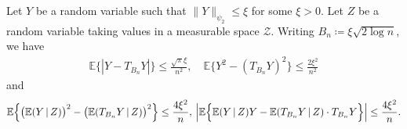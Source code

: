 \documentclass[10pt,a4paper]{amsart}
\begin{document}
\begin{lemma} \label{lemma:truncation-bias}
    Let $Y$ be a random variable such that $\|Y\|_{\psi_2} \leq \xi$ for some $\xi > 0$.  Let $Z$ be a random variable taking values in a measurable space $\mathcal{Z}$.  Writing $B_n\coloneqq \xi\sqrt{2\log n}$, we have
    \begin{align*}
        \mathbb{E}\{|Y - T_{B_n}Y|\} \leq \frac{\sqrt{\pi}\xi}{n^2}, \quad \mathbb{E}\bigl\{Y^2 - (T_{B_n}Y)^2\bigr\} \leq \frac{2\xi^2}{n^2}
    \end{align*}
    and
    \begin{align*}
        \mathbb{E}\Bigl\{\bigl(\mathbb{E}(Y\,|\,Z)\bigr)^2 - \bigl(\mathbb{E}(T_{B_n}Y\,|\,Z)\bigr)^2 \Bigr\} \leq \frac{4\xi^2}{n}, \, \Bigl|\mathbb{E}\Bigl\{\mathbb{E}(Y\,|\,Z)Y - \mathbb{E}(T_{B_n}Y\,|\,Z) \cdot T_{B_n}Y\Bigr\}\Bigr| \leq \frac{4\xi^2}{n}.
    \end{align*}
\end{lemma}
\end{document}
